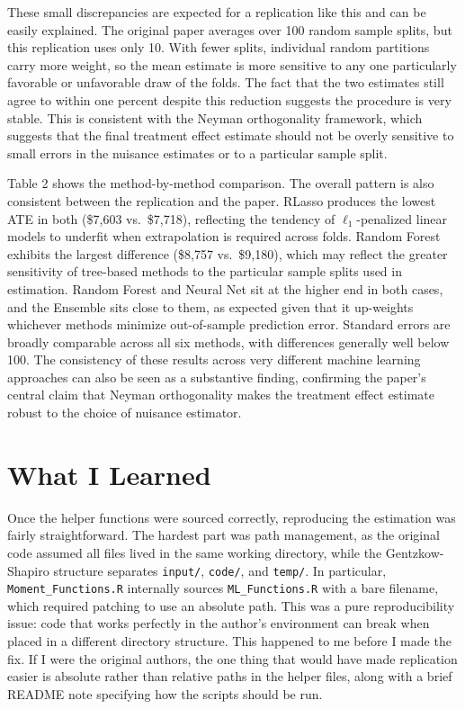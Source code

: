\documentclass[12pt]{article}
\begin{document}
These small discrepancies are expected for a replication like this and can
be easily explained. The original paper averages over 100 random sample
splits, but this replication uses only 10. With fewer splits, individual
random partitions carry more weight, so the mean estimate is more sensitive
to any one particularly favorable or unfavorable draw of the folds. The
fact that the two estimates still agree to within one percent despite this
reduction suggests the procedure is very stable. This is consistent with
the Neyman orthogonality framework, which suggests that the final treatment
effect estimate should not be overly sensitive to small errors in the
nuisance estimates or to a particular sample split.

Table 2 shows the method-by-method comparison. The overall pattern is
also consistent between the replication and the paper. RLasso produces the
lowest ATE in both (\$7,603 vs.\ \$7,718), reflecting the tendency of
$\ell_1$-penalized linear models to underfit when extrapolation is required
across folds. Random Forest exhibits the largest difference (\$8,757
vs.\ \$9,180), which may reflect the greater sensitivity of tree-based
methods to the particular sample splits used in estimation. Random Forest
and Neural Net sit at the higher end in both cases, and the Ensemble sits
close to them, as expected given that it up-weights whichever methods
minimize out-of-sample prediction error. Standard errors are broadly
comparable across all six methods, with differences generally well below
100. The consistency of these results across very different machine
learning approaches can also be seen as a substantive finding, confirming
the paper's central claim that Neyman orthogonality makes the treatment
effect estimate robust to the choice of nuisance estimator.

\section{What I Learned}

\noindent Once the helper functions were sourced correctly, reproducing the
estimation was fairly straightforward. The hardest part was path management,
as the original code assumed all files lived in the same working directory,
while the Gentzkow-Shapiro structure separates \texttt{input/},
\texttt{code/}, and \texttt{temp/}. In particular,
\texttt{Moment\_Functions.R} internally sources \texttt{ML\_Functions.R}
with a bare filename, which required patching to use an absolute path. This
was a pure reproducibility issue\@: code that works perfectly in the author's
environment can break when placed in a different directory structure. This
happened to me before I made the fix. If I were the original authors, the
one thing that would have made replication easier is absolute rather than
relative paths in the helper files, along with a brief README note
specifying how the scripts should be run.
\end{document}
